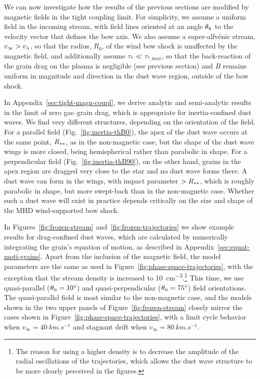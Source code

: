 We can now investigate how the results of the previous sections are
modified by magnetic fields in the tight coupling limit.  For
simplicity, we assume a uniform field in the incoming stream, with
field lines oriented at an angle \(\theta_{\scriptscriptstyle\text{B}}\) to the velocity vector that
defines the bow axis.  We also assume a super-alfvénic stream,
\(v_\infty > v_{\scriptscriptstyle\text{A}}\), so that the radius, \(R_0\), of the wind bow shock
is unaffected by the magnetic field, and additionally assume
\(\tau_* \ll \tau_{*, \text{max}}\), so that the back-reaction of the grain
drag on the plasma is negligible (see previous section) and \(B\)
remains uniform in magnitude and direction in the dust wave region,
outside of the bow shock.

In Appendix~\ref{sec:tight-magn-coupl}, we derive analytic and
semi-analytic results in the limit of zero gas--grain drag, which is
appropriate for inertia-confined dust waves. We find very different
structures, depending on the orientation of the field.  For a parallel
field (Fig.~\ref{fig:inertia-thB0}), the apex of the dust wave occurs
at the same point, \(R_{**}\), as in the non-magnetic case, but
the shape of the dust wave wings is more closed, being hemispherical
rather than parabolic in shape.  For a perpendicular field
(Fig.~\ref{fig:inertia-thB90}), on the other hand, grains in the apex
region are dragged very close to the star and no dust wave forms
there.  A dust wave can form in the wings, with impact parameter
\(> R_{**}\), which is roughly parabolic in shape, but more
swept-back than in the non-magnetic case.  Whether such a dust wave
will exist in practice depends critically on the size and shape of the
MHD wind-supported bow shock.

In Figures~\ref{fig:frozen-stream} and~\ref{fig:frozen-trajectories}
we show example results for drag-confined dust waves, which are
calculated by numerically integrating the grain's equation of motion,
as described in Appendix~\ref{sec:equat-moti-grains}. Apart from the
inclusion of the magnetic field, the model parameters are the same as
used in Figure~\ref{fig:phase-space-trajectories}, with the exception
that the stream density is increased to \SI{10}{cm^{-3}}.\footnote{The
  reason for using a higher density is to decrease the amplitude of
  the radial oscillations of the trajectories, which allows the dust
  wave structure to be more clearly perceived in the figures. } This
time, we use quasi-parallel (\(\theta_{\scriptscriptstyle\text{B}} = \ang{10}\)) and
quasi-perpendicular (\(\theta_{\scriptscriptstyle\text{B}} = \ang{75}\)) field orientations.  The
quasi-parallel field is most similar to the non-magnetic case, and the
models shown in the two upper panels of Figure~\ref{fig:frozen-stream}
closely mirror the cases shown in
Figure~\ref{fig:phase-space-trajectories}, with a limit cycle behavior
when \(v_\infty = \SI{40}{km.s^{-1}}\) and stagnant drift when
\(v_\infty = \SI{80}{km.s^{-1}}\).


